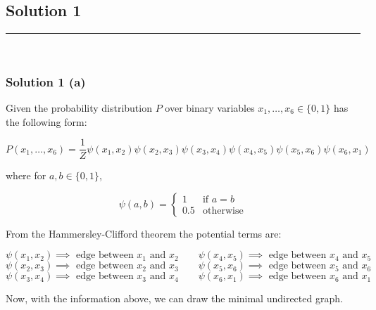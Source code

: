 \documentclass{article}
\begin{document}
\pagestyle{fancy}

\subsection*{Solution 1}
\noindent\rule{\textwidth}{0.4pt}\\

\subsubsection*{Solution 1 (a)}
\begin{flushleft}
    Given the probability distribution $P$ over binary variables $x_1, \ldots, x_6 \in \{0, 1\}$ has the following form:
\end{flushleft}
$$
P(x_1, \ldots, x_6) = \frac{1}{Z} \psi(x_1, x_2)\psi(x_2, x_3)\psi(x_3, x_4)\psi(x_4, x_5)\psi(x_5, x_6)\psi(x_6, x_1)
$$
\begin{flushleft}
    where for $a, b \in \{0, 1\}$,
\end{flushleft}
$$
\psi(a, b) = \begin{cases}
1 & \text{if } a = b\\
0.5 & \text{otherwise}
\end{cases}
$$
\begin{flushleft}
    From the Hammersley-Clifford theorem the potential terms are:
\end{flushleft}
$$\psi(x_1, x_2) \implies \text{ edge between } x_1 \text{ and } x_2 \qquad \psi(x_4, x_5) \implies \text{ edge between } x_4 \text{ and } x_5$$
$$\psi(x_2, x_3) \implies \text{ edge between } x_2 \text{ and } x_3 \qquad \psi(x_5, x_6) \implies \text{ edge between } x_5 \text{ and } x_6$$
$$\psi(x_3, x_4) \implies \text{ edge between } x_3 \text{ and } x_4 \qquad \psi(x_6, x_1) \implies \text{ edge between } x_6 \text{ and } x_1$$
\begin{flushleft}
    Now, with the information above, we can draw the minimal undirected graph.
\end{flushleft}

\begin{center}
\end{center}
\end{document}
